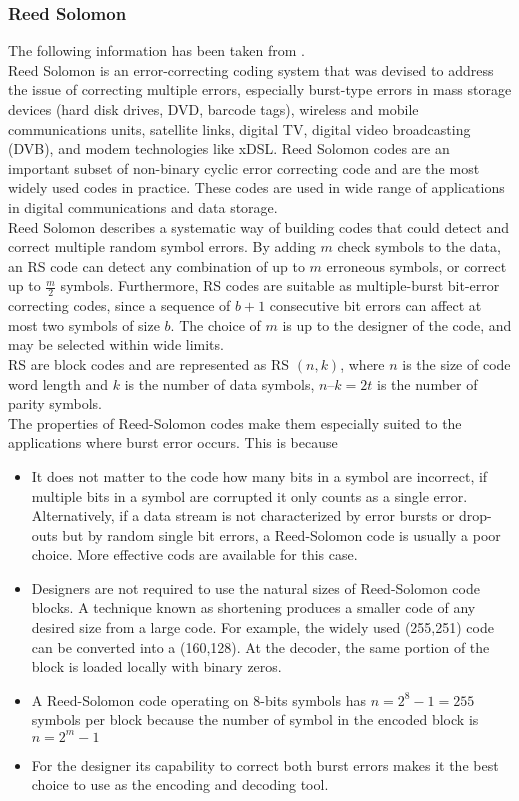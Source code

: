 \subsubsection{Reed Solomon}
The following information has been taken from \cite{ReedSolmon_ResearchPaper}.\\
Reed Solomon is an error-correcting coding system that was devised to address the issue of correcting multiple 
errors, especially burst-type errors in mass storage devices (hard disk drives, DVD, barcode tags), wireless and mobile 
communications units, satellite links, digital TV, digital video broadcasting (DVB), and modem technologies like xDSL. Reed Solomon codes are an important subset of non-binary cyclic error correcting code and are the most widely used codes in practice. These codes are  used in wide range of applications in digital communications and data  storage. \\
Reed Solomon describes a systematic  way of building codes that could detect and correct multiple random symbol errors. By adding $m$ check symbols to the data, an RS code can detect any combination of up to $m$ erroneous symbols, or correct up to $\frac{m}{2}$ symbols. Furthermore, RS codes are suitable as multiple-burst bit-error correcting codes, since a sequence of $b + 1$ consecutive bit errors can affect at most two symbols of size $b$. The choice of $m$ is up to the designer of the code, and may be selected within wide limits.\\
RS are  block codes and are  represented as RS $(n, k)$,  where  $n$ is the  size  of code  word length and $k$ is the number of data symbols, $n$–$k = 2t$ is the number of parity symbols.\\
The properties of Reed-Solomon codes make them especially suited to the applications where burst error occurs. This is because
\begin{itemize}
    \item It does not matter to the code how many bits in a symbol are incorrect, if multiple bits in a symbol are corrupted it only counts as a single error. Alternatively, if a data stream is not characterized by error bursts or drop-outs but by random single bit errors, a Reed-Solomon code is usually a poor choice. More effective cods are available for this case.
    \item Designers are not required to use the natural sizes of Reed-Solomon code blocks. A technique known as shortening produces a smaller code of any desired size from a large code. For example, the widely used (255,251) code can be converted into a (160,128). At the decoder, the same portion of the block is loaded locally with binary zeros.
    \item A Reed-Solomon code operating on 8-bits symbols has $n=2^8-1 = 255$ symbols per block because the number of symbol in the encoded block is $n = 2^m-1$
    \item For the designer its capability to correct both burst errors makes it the best choice to use as the encoding and decoding tool.
\end{itemize}
%
%
